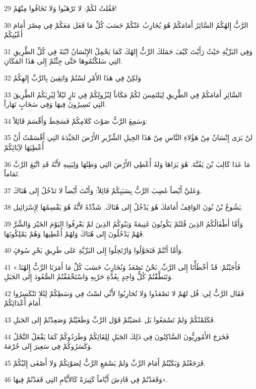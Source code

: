 \par 29 فَقُلتُ لكُمْ: لا تَرْهَبُوا وَلا تَخَافُوا مِنْهُمُ!
\par 30 الرَّبُّ إِلهُكُمُ السَّائِرُ أَمَامَكُمْ هُوَ يُحَارِبُ عَنْكُمْ حَسَبَ كُلِّ مَا فَعَل مَعَكُمْ فِي مِصْرَ أَمَامَ أَعْيُنِكُمْ
\par 31 وَفِي البَرِّيَّةِ حَيْثُ رَأَيْتَ كَيْفَ حَمَلكَ الرَّبُّ إِلهُكَ كَمَا يَحْمِلُ الإِنْسَانُ ابْنَهُ فِي كُلِّ الطَّرِيقِ التِي سَلكْتُمُوهَا حَتَّى جِئْتُمْ إِلى هَذَا المَكَانِ.
\par 32 وَلكِنْ فِي هَذَا الأَمْرِ لسْتُمْ وَاثِقِينَ بِالرَّبِّ إِلهِكُمُ
\par 33 السَّائِرِ أَمَامَكُمْ فِي الطَّرِيقِ لِيَلتَمِسَ لكُمْ مَكَاناً لِنُزُولِكُمْ فِي نَارٍ ليْلاً لِيُرِيَكُمُ الطَّرِيقَ التِي تَسِيرُونَ فِيهَا وَفِي سَحَابٍ نَهَاراً.
\par 34 وَسَمِعَ الرَّبُّ صَوْتَ كَلامِكُمْ فَسَخِطَ وَأَقْسَمَ قَائِلاً:
\par 35 لنْ يَرَى إِنْسَانٌ مِنْ هَؤُلاءِ النَّاسِ مِنْ هَذَا الجِيلِ الشِّرِّيرِ الأَرْضَ الجَيِّدَةَ التِي أَقْسَمْتُ أَنْ أُعْطِيَهَا لآِبَائِكُمْ
\par 36 مَا عَدَا كَالِبَ بْنَ يَفُنَّةَ. هُوَ يَرَاهَا وَلهُ أُعْطِي الأَرْضَ التِي وَطِئَهَا وَلِبَنِيهِ لأَنَّهُ قَدِ اتَّبَعَ الرَّبَّ تَمَاماً.
\par 37 وَعَليَّ أَيْضاً غَضِبَ الرَّبُّ بِسَبَبِكُمْ قَائِلاً: وَأَنْتَ أَيْضاً لا تَدْخُلُ إِلى هُنَاكَ.
\par 38 يَشُوعُ بْنُ نُونَ الوَاقِفُ أَمَامَكَ هُوَ يَدْخُلُ إِلى هُنَاكَ. شَدِّدْهُ لأَنَّهُ هُوَ يَقْسِمُهَا لِإِسْرَائِيل.
\par 39 وَأَمَّا أَطْفَالُكُمُ الذِينَ قُلتُمْ يَكُونُونَ غَنِيمَةً وَبَنُوكُمُ الذِينَ لمْ يَعْرِفُوا اليَوْمَ الخَيْرَ وَالشَّرَّ فَهُمْ يَدْخُلُونَ إِلى هُنَاكَ وَلهُمْ أُعْطِيهَا وَهُمْ يَمْلِكُونَهَا.
\par 40 وَأَمَّا أَنْتُمْ فَتَحَوَّلُوا وَارْتَحِلُوا إِلى البَرِّيَّةِ عَلى طَرِيقِ بَحْرِ سُوفٍَ.
\par 41 «فَأَجَبْتُمْ: قَدْ أَخْطَأْنَا إِلى الرَّبِّ. نَحْنُ نَصْعَدُ وَنُحَارِبُ حَسَبَ كُلِّ مَا أَمَرَنَا الرَّبُّ إِلهُنَا. وَتَنَطَّقْتُمْ كُلُّ وَاحِدٍ بِعُدَّةِ حَرْبِهِ وَاسْتَخْفَفْتُمُ الصُّعُودَ إِلى الجَبَلِ.
\par 42 فَقَال الرَّبُّ لِي: قُل لهُمْ لا تَصْعَدُوا وَلا تُحَارِبُوا لأَنِّي لسْتُ فِي وَسَطِكُمْ لِئَلا تَنْكَسِرُوا أَمَامَ أَعْدَائِكُمْ.
\par 43 فَكَلمْتُكُمْ وَلمْ تَسْمَعُوا بَل عَصَيْتُمْ قَوْل الرَّبِّ وَطَغَيْتُمْ وَصَعِدْتُمْ إِلى الجَبَلِ.
\par 44 فَخَرَجَ الأَمُورِيُّونَ السَّاكِنُونَ فِي ذَلِكَ الجَبَلِ لِلِقَائِكُمْ وَطَرَدُوكُمْ كَمَا يَفْعَلُ النَّحْلُ وَكَسَرُوكُمْ فِي سَعِيرَ إِلى حُرْمَةَ.
\par 45 فَرَجَعْتُمْ وَبَكَيْتُمْ أَمَامَ الرَّبِّ وَلمْ يَسْمَعِ الرَّبُّ لِصَوْتِكُمْ وَلا أَصْغَى إِليْكُمْ.
\par 46 وَقَعَدْتُمْ فِي قَادِشَ أَيَّاماً كَثِيرَةً كَالأَيَّامِ التِي قَعَدْتُمْ فِيهَا».

